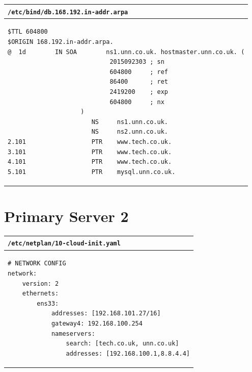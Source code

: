 \documentclass[11pt]{article}
\begin{document}
\begin{table}[ht]
    \begin{tabular}{|p{17.5cm}|} 
        \hline
        \texttt{\textbf{/etc/bind/db.168.192.in-addr.arpa}}\\ 
        \hline
        \lstset{
                basicstyle=\scriptsize\ttfamily,
              }
              \begin{lstlisting}
$TTL 604800
$ORIGIN 168.192.in-addr.arpa.
@  1d        IN SOA        ns1.unn.co.uk. hostmaster.unn.co.uk. (
                            2015092303 ; sn
                            604800     ; ref
                            86400      ; ret
                            2419200    ; exp
                            604800     ; nx
                    )
                       NS     ns1.unn.co.uk.
                       NS     ns2.unn.co.uk.
2.101                  PTR    www.tech.co.uk.
3.101                  PTR    www.tech.co.uk.
4.101                  PTR    www.tech.co.uk.
5.101                  PTR    mysql.unn.co.uk.
        \end{lstlisting}\\
        \hline
    \end{tabular}
\end{table}

\clearpage
\section{Primary Server 2}
\begin{table}[ht]
    \begin{tabular}{|p{17.5cm}|} 
        \hline
        \texttt{\textbf{/etc/netplan/10-cloud-init.yaml}}\\ 
        \hline
        \lstset{
                basicstyle=\scriptsize\ttfamily,
              }
              \begin{lstlisting}
# NETWORK CONFIG
network:
    version: 2
    ethernets:
        ens33:
            addresses: [192.168.101.27/16]
            gateway4: 192.168.100.254
            nameservers:
                search: [tech.co.uk, unn.co.uk]
                addresses: [192.168.100.1,8.8.4.4]
        \end{lstlisting}\\
        \hline
    \end{tabular}
\end{table}
\end{document}
